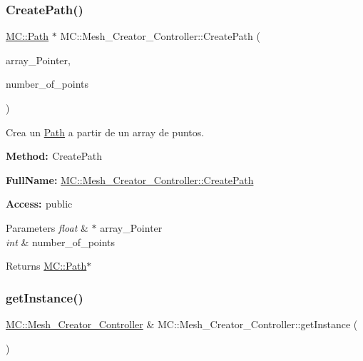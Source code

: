 \subsubsection{\texorpdfstring{CreatePath()}{CreatePath()}\hspace{0.1cm}{\footnotesize\ttfamily [2/2]}}
{\footnotesize\ttfamily \mbox{\hyperlink{class_m_c_1_1_path}{M\+C\+::\+Path}} $\ast$ M\+C\+::\+Mesh\+\_\+\+Creator\+\_\+\+Controller\+::\+Create\+Path (\begin{DoxyParamCaption}\item[{float $\ast$}]{array\+\_\+\+Pointer,  }\item[{int}]{number\+\_\+of\+\_\+points }\end{DoxyParamCaption})}



Crea un \mbox{\hyperlink{class_m_c_1_1_path}{Path}} a partir de un array de puntos. 

{\bfseries{Method\+: }} Create\+Path

{\bfseries{Full\+Name\+:}} \mbox{\hyperlink{class_m_c_1_1_mesh___creator___controller_abbac03a7390bacd9a804c46e64e431ba}{M\+C\+::\+Mesh\+\_\+\+Creator\+\_\+\+Controller\+::\+Create\+Path}}

{\bfseries{Access\+: }} public 
\begin{DoxyParams}{Parameters}
{\em float} & $\ast$ array\+\_\+\+Pointer \\
\hline
{\em int} & number\+\_\+of\+\_\+points \\
\hline
\end{DoxyParams}
\begin{DoxyReturn}{Returns}
\mbox{\hyperlink{class_m_c_1_1_path}{M\+C\+::\+Path}}$\ast$ 
\end{DoxyReturn}
\mbox{\label{class_m_c_1_1_mesh___creator___controller_af0292e4c19965d62bd9b7b92c1adbbc2}} 
\subsubsection{\texorpdfstring{getInstance()}{getInstance()}}
{\footnotesize\ttfamily \mbox{\hyperlink{class_m_c_1_1_mesh___creator___controller}{M\+C\+::\+Mesh\+\_\+\+Creator\+\_\+\+Controller}} \& M\+C\+::\+Mesh\+\_\+\+Creator\+\_\+\+Controller\+::get\+Instance (\begin{DoxyParamCaption}{ }\end{DoxyParamCaption})\hspace{0.3cm}{\ttfamily [static]}}



